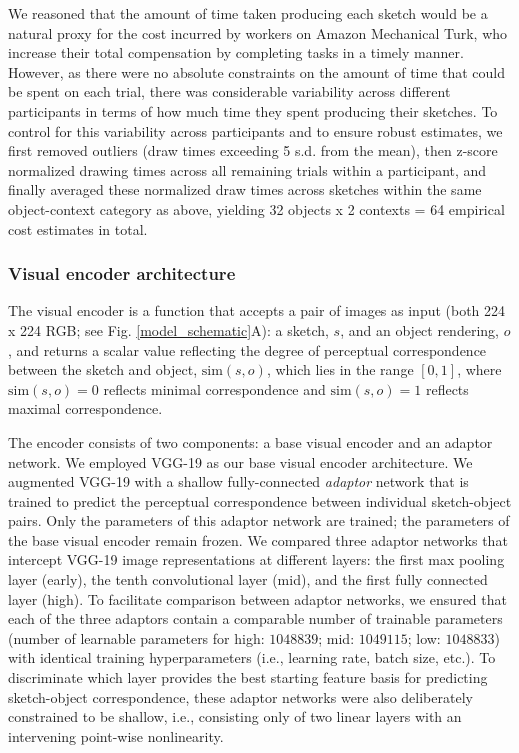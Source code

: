 \documentclass{svjour3}
\begin{document}
We reasoned that the amount of time taken producing each sketch would be a natural proxy for the cost incurred by workers on Amazon Mechanical Turk, who increase their total compensation by completing tasks in a timely manner. 
However, as there were no absolute constraints on the amount of time that could be spent on each trial, there was considerable variability across different participants in terms of how much time they spent producing their sketches. 
To control for this variability across participants and to ensure robust estimates, we first removed outliers (draw times exceeding 5 s.d. from the mean), then z-score normalized drawing times across all remaining trials within a participant, and finally averaged these normalized draw times across sketches within the same object-context category as above, yielding 32 objects x 2 contexts = 64 empirical cost estimates in total.

\subsubsection*{Visual encoder architecture}

The visual encoder is a function that accepts a pair of images as input (both 224 x 224 RGB; see Fig. \ref{model_schematic}A): a sketch, $s$, and an object rendering, $o$, and returns a scalar value reflecting the degree of perceptual correspondence between the sketch and object, $\textrm{sim}(s,o)$, which lies in the range $[0,1]$, where $\textrm{sim}(s,o)=0$ reflects minimal correspondence and $\textrm{sim}(s,o)=1$ reflects maximal correspondence.

The encoder consists of two components: a base visual encoder and an adaptor network. 
We employed VGG-19 \citep*{simonyan2014very} as our base visual encoder architecture.
We augmented VGG-19 with a shallow fully-connected \textit{adaptor} network that is trained to predict the perceptual correspondence between individual sketch-object pairs. 
Only the parameters of this adaptor network are trained; the parameters of the base visual encoder remain frozen. 
We compared three adaptor networks that intercept VGG-19 image representations at different layers: the first max pooling layer (early), the tenth convolutional layer (mid), and the first fully connected layer (high). 
To facilitate comparison between adaptor networks, we ensured that each of the three adaptors contain a comparable number of trainable parameters (number of learnable parameters for high: $1048839$; mid: $1049115$; low: $1048833$) with identical training hyperparameters (i.e., learning rate, batch size, etc.). 
To discriminate which layer provides the best starting feature basis for predicting sketch-object correspondence, these adaptor networks were also deliberately constrained to be shallow, i.e., consisting only of two linear layers with an intervening point-wise nonlinearity.
\end{document}
